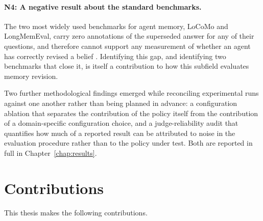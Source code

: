 \paragraph{N4: A negative result about the standard benchmarks.} The two most widely used benchmarks for agent memory, LoCoMo and LongMemEval, carry zero annotations of the superseded answer for any of their questions, and therefore cannot support any measurement of whether an agent has correctly revised a belief \citep{maharana2024locomo,wu2025longmemeval}. Identifying this gap, and identifying two benchmarks that close it, is itself a contribution to how this subfield evaluates memory revision.

Two further methodological findings emerged while reconciling experimental runs against one another rather than being planned in advance: a configuration ablation that separates the contribution of the policy itself from the contribution of a domain-specific configuration choice, and a judge-reliability audit that quantifies how much of a reported result can be attributed to noise in the evaluation procedure rather than to the policy under test. Both are reported in full in Chapter~\ref{chap:results}.

\section{Contributions}
\label{sec:contributions}

This thesis makes the following contributions.

